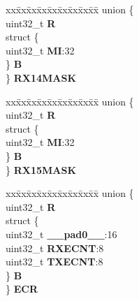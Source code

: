 \begin{DoxyCompactItemize}
\begin{tabbing}
\end{tabbing}\item 
\mbox{\label{structFLEXCAN__tag_a901520119cdb7d50ec4fba2ce613a13e}} 
\begin{tabbing}
xx\=xx\=xx\=xx\=xx\=xx\=xx\=xx\=xx\=\kill
union \{\\
\>uint32\_t {\bfseries R}\\
\>struct \{\\
\>\>uint32\_t {\bfseries MI}:32\\
\>\} {\bfseries B}\\
\} {\bfseries RX14MASK}\\

\end{tabbing}\item 
\mbox{\label{structFLEXCAN__tag_a36ee63e11769c8c6e719ac748ce908de}} 
\begin{tabbing}
xx\=xx\=xx\=xx\=xx\=xx\=xx\=xx\=xx\=\kill
union \{\\
\>uint32\_t {\bfseries R}\\
\>struct \{\\
\>\>uint32\_t {\bfseries MI}:32\\
\>\} {\bfseries B}\\
\} {\bfseries RX15MASK}\\

\end{tabbing}\item 
\mbox{\label{structFLEXCAN__tag_ac452ba779ffa7a445c09136fb5d639fd}} 
\begin{tabbing}
xx\=xx\=xx\=xx\=xx\=xx\=xx\=xx\=xx\=\kill
union \{\\
\>uint32\_t {\bfseries R}\\
\>struct \{\\
\>\>uint32\_t {\bfseries \_\_pad0\_\_}:16\\
\>\>uint32\_t {\bfseries RXECNT}:8\\
\>\>uint32\_t {\bfseries TXECNT}:8\\
\>\} {\bfseries B}\\
\} {\bfseries ECR}\\


\end{tabbing}
\end{DoxyCompactItemize}
